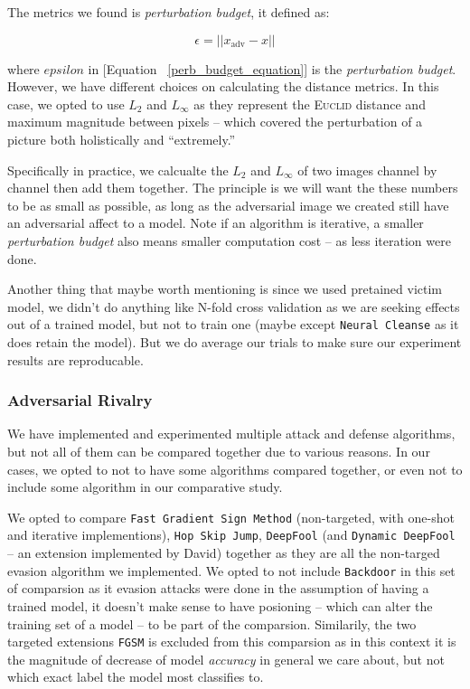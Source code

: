\documentclass[11pt]{article}
\newcommand{\ilc}{\texttt}
\begin{document}
The metrics we found is \textit{perturbation budget}\cite{cite:perb_budget}, it defined as:

\begin{equation}
     \epsilon = || x_{\text{adv}} - x ||
     \label{perb_budget_equation}
\end{equation}

where $epsilon$ in [Equation \ \ref{perb_budget_equation}] is the \textit{perturbation budget}. However, we have different choices on calculating the distance metrics. In this case, we opted to use $L_2$ and $L_{\infty}$ as they represent the \textsc{Euclid} distance and maximum magnitude between pixels -- which covered the perturbation of a picture both holistically and ``extremely.''

Specifically in practice, we calcualte the $L_2$ and $L_{\infty}$ of two images channel by channel then add them together. The principle is we will want the these numbers to be as small as possible, as long as the adversarial image we created still have an adversarial affect to a model. Note if an algorithm is iterative, a smaller \textit{perturbation budget} also means smaller computation cost -- as less iteration were done.\newline

\noindent Another thing that maybe worth mentioning is since we used pretained victim model, we didn't do anything like N-fold cross validation as we are seeking effects out of a trained model, but not to train one (maybe except \ilc{Neural Cleanse} as it does retain the model). But we do average our trials to make sure our experiment results are reproducable.


\subsubsection{Adversarial Rivalry}

We have implemented and experimented multiple attack and defense algorithms, but not all of them can be compared together due to various reasons. In our cases, we opted to not to have some algorithms compared together, or even not to include some algorithm in our comparative study.

We opted to compare \ilc{Fast Gradient Sign Method} (non-targeted, with one-shot and iterative implementions), \ilc{Hop Skip Jump}, \ilc{DeepFool} (and \ilc{Dynamic DeepFool} -- an extension implemented by David) together as they are all the non-targed evasion algorithm we implemented. We opted to not include \ilc{Backdoor} in this set of comparsion as it evasion attacks were done in the assumption of having a trained model, it doesn't make sense to have posioning -- which can alter the training set of a model -- to be part of the comparsion. Similarily, the two targeted extensions \ilc{FGSM} is excluded from this comparsion as in this context it is the magnitude of decrease of model \textit{accuracy} in general we care about, but not which exact label the model most classifies to.
\end{document}
